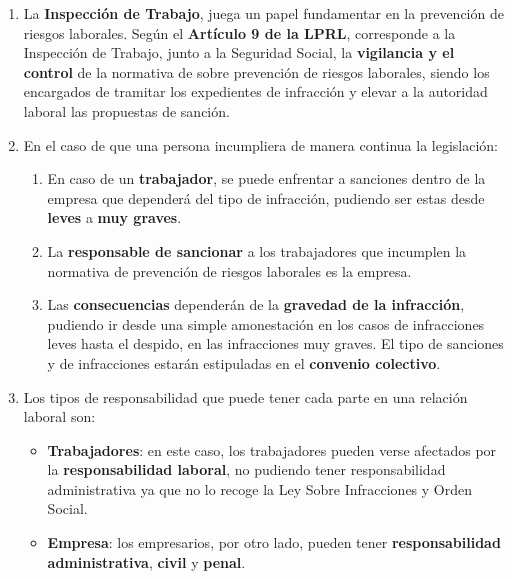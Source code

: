 \begin{enumerate}
    \item La \textbf{Inspección de Trabajo}, juega un papel fundamentar en la prevención de riesgos laborales. Según el \textbf{Artículo 9 de la LPRL}, corresponde a la Inspección de Trabajo, junto a la Seguridad Social, la \textbf{vigilancia y el control} de la normativa de sobre prevención de riesgos laborales, siendo los encargados de tramitar los expedientes de infracción y elevar a la autoridad  laboral las propuestas de sanción.

    \item En el caso de que una persona incumpliera de manera continua la legislación:

    \begin{enumerate}
        \item En caso de un \textbf{trabajador}, se puede enfrentar a sanciones dentro de la empresa que dependerá del tipo de infracción, pudiendo ser estas desde \textbf{leves} a \textbf{muy graves}.
        \item La \textbf{responsable de sancionar} a los trabajadores que incumplen la normativa de prevención de riesgos laborales es la empresa.
        \item Las \textbf{consecuencias} dependerán de la \textbf{gravedad de la infracción}, pudiendo ir desde una simple amonestación en los casos de infracciones leves hasta el despido, en las infracciones muy graves. El tipo de sanciones y de infracciones estarán estipuladas en el \textbf{convenio colectivo}.
    \end{enumerate}

    \item Los tipos de responsabilidad que puede tener cada parte en una relación laboral son:
    \begin{itemize}
        \item \textbf{Trabajadores}: en este caso, los trabajadores pueden verse afectados por la \textbf{responsabilidad laboral}, no pudiendo tener responsabilidad administrativa ya que no lo recoge la Ley Sobre Infracciones y Orden Social.

        \item \textbf{Empresa}: los empresarios, por otro lado, pueden tener \textbf{responsabilidad administrativa}, \textbf{civil} y \textbf{penal}.
    \end{itemize}
\end{enumerate}



\newpage



